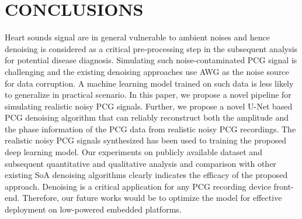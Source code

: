 \documentclass[sigconf,screen]{acmart}
\begin{document}
\section{CONCLUSIONS}
Heart sounds signal are in general vulnerable to ambient noises and hence denoising is considered as a critical pre-processing step in the subsequent analysis for potential disease diagnosis. Simulating such noise-contaminated PCG signal is challenging and the existing denoising approaches use AWG as the noise source for data corruption. A machine learning model trained on such data is less likely to generalize in practical scenario. In this paper, we propose a novel pipeline for simulating realistic noisy PCG signals. Further, we propose a novel U-Net based PCG denoising algorithm that can reliably reconstruct both the amplitude and the phase information of the PCG data from realistic noisy PCG recordings. The realistic noisy PCG signals synthesized has been used to training the proposed deep learning model. Our experiments on publicly available dataset and subsequent quantitative and qualitative analysis and comparison with other existing SoA denoising algorithms clearly indicates the efficacy of the proposed approach. 
\newline Denoising is a critical application for any PCG recording device front-end. Therefore, our future works would be to optimize the model for effective deployment on low-powered embedded platforms. 
% 


\end{document}
